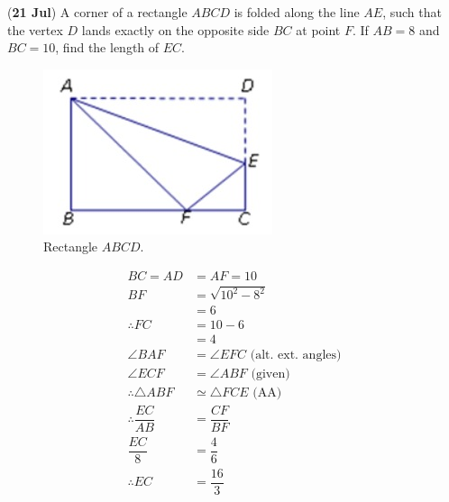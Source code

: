 \documentclass[12pt,answers]{exam}
\renewcommand{\frac}[2]{\dfrac{#1}{#2}}
\newcommand{\qndate}[2]{(\textbf{#1 #2})}
\begin{document}
\begin{questions}
	\question \qndate{21}{Jul} A corner of a rectangle $ABCD$ is folded along the line $AE$,
	such that the vertex $D$ lands exactly on the opposite side $BC$ at point $F$.
	If $AB=8$ and $BC=10$, find the length of $EC$.
	\begin{figure}[htpb]
		\centering
		\includegraphics[scale=.6]{images/0721_Tri.jpeg}
		\caption{Rectangle $ABCD$.}
		\label{fig:0721_Tri}
	\end{figure}
	\begin{solution}
		\begin{align*}
			BC = AD                  & = AF = 10                               \\
			BF                       & = \sqrt{{10}^2-8^2}                     \\
			                         & = 6                                     \\
			\therefore FC            & = 10 - 6                                \\
			                         & = 4                                     \\
			\angle BAF               & = \angle EFC \text{ (alt. ext. angles)} \\
			\angle ECF               & = \angle ABF \text{ (given)}            \\
			\therefore \triangle ABF & \simeq \triangle FCE \text{ (AA)}       \\
			\therefore \frac{EC}{AB} & = \frac{CF}{BF}                         \\
			\frac{EC}{8}             & = \frac{4}{6}                           \\
			\therefore EC            & = \frac{16}{3}
		\end{align*}
	\end{solution}


\end{questions}
\end{document}
